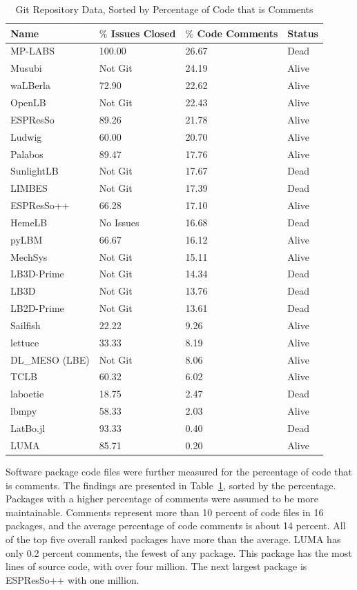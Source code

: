 \documentclass[final, 3p, times, authoryear]{elsarticle}
\begin{document}
\begin{table}
	\begin{center}
		\begin{tabular}{ p{3.5cm}p{3.5cm}p{3.5cm}p{2.5cm} }
			\toprule
			Name & $\%$ Issues Closed & $\%$ Code Comments & Status\\
			\midrule
			MP-LABS & 100.00 & 26.67 & Dead\\
			Musubi & Not Git & 24.19 & Alive\\
			waLBerla & 72.90 & 22.62 & Alive\\
			OpenLB & Not Git & 22.43 & Alive\\
			ESPResSo & 89.26 & 21.78 & Alive\\
			Ludwig& 60.00 & 20.70 & Alive\\
			Palabos & 89.47 & 17.76 & Alive\\
			SunlightLB & Not Git & 17.67 & Dead\\
			LIMBES & Not Git & 17.39 & Dead\\
			ESPResSo++ & 66.28 & 17.10 & Alive\\
			HemeLB & No Issues & 16.68 & Dead\\
			pyLBM & 66.67& 16.12 & Alive\\
			MechSys & Not Git & 15.11 & Alive\\
			LB3D-Prime & Not Git & 14.34 & Dead\\
			LB3D & Not Git & 13.76 & Dead\\
			LB2D-Prime & Not Git & 13.61 & Dead\\
			Sailfish & 22.22 & 9.26 & Alive\\
			lettuce & 33.33 & 8.19 & Alive\\
			DL\_MESO (LBE) & Not Git & 8.06& Alive\\
			TCLB & 60.32 & 6.02 & Alive\\
			laboetie & 18.75 & 2.47 & Dead\\	
			lbmpy& 58.33  & 2.03 & Alive\\	
			LatBo.jl & 93.33 & 0.40 & Dead\\
			LUMA& 85.71   & 0.20 & Alive\\
			\bottomrule
		\end{tabular}
		\caption{Git Repository Data, Sorted by Percentage of Code that is
		Comments} \label{gitrepodata}
	\end{center}
	\end{table}
		
Software package code files were further measured for the percentage of code
that is comments. The findings are presented in Table~\ref{gitrepodata}, sorted
by the percentage. Packages with a higher percentage of comments were assumed to
be more maintainable. Comments represent more than 10 percent of code files in
16 packages, and the average percentage of code comments is about 14 percent.
All of the top five overall ranked packages have more than the average. LUMA has
only 0.2 percent comments, the fewest of any package. This package has the most
lines of source code, with over four million. The next largest package is
ESPResSo++ with one million.
\end{document}
